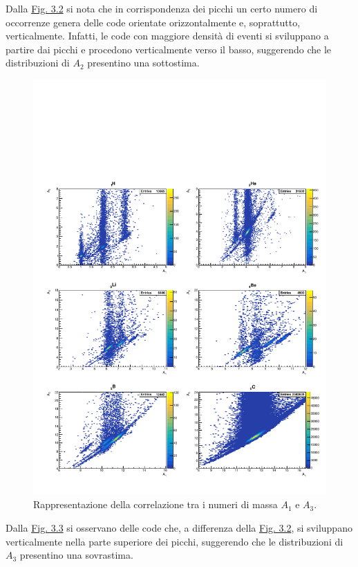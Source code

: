 \documentclass[12pt,a4paper,twoside]{report}
\begin{document}
	Dalla \hyperref[fig:a1]{Fig. 3.2} si nota che in corrispondenza dei picchi un certo numero di occorrenze genera delle code orientate orizzontalmente e, soprattutto, verticalmente. Infatti, le code con maggiore densità di eventi si sviluppano a partire dai picchi e procedono verticalmente verso il basso, suggerendo che le distribuzioni di $A_2$ presentino una sottostima.
	\begin{figure}[H]
		\centering
		\includegraphics[width=1.03\linewidth,center]{c_MultiCanvas2.pdf}
		\caption{Rappresentazione della correlazione tra i numeri di massa $A_1$ e $A_3$.}
		\label{fig:a2}
	\end{figure}
	Dalla \hyperref[fig:a2]{Fig. 3.3} si osservano delle code che, a differenza della \hyperref[fig:a1]{Fig. 3.2}, si sviluppano verticalmente nella parte superiore dei picchi, suggerendo che le distribuzioni di $A_3$ presentino una sovrastima.
\end{document}
